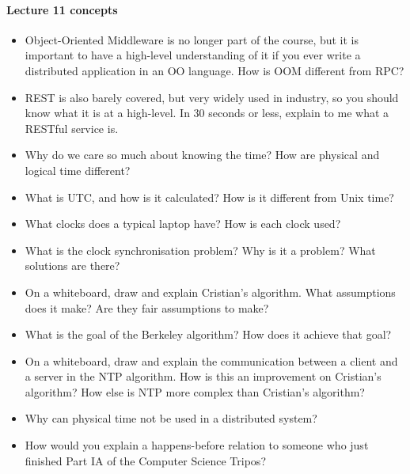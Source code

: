 \documentclass[12pt,a4paper,oneside,openright]{report}
\newcommand{\question}[2]{\paragraph{#1} #2}
\begin{document}
\question{Lecture 11 concepts}{
  \begin{itemize}
  \item Object-Oriented Middleware is no longer part of the course,
    but it is important to have a high-level understanding of it if
    you ever write a distributed application in an OO language. How is
    OOM different from RPC?
  \item REST is also barely covered, but very widely used in industry,
    so you should know what it is at a high-level. In 30 seconds or
    less, explain to me what a RESTful service is.
  \item Why do we care so much about knowing the time? How are
    physical and logical time different?
  \item What is UTC, and how is it calculated? How is it different
    from Unix time?
  \item What clocks does a typical laptop have? How is each clock
    used?
  \item What is the clock synchronisation problem? Why is it a
    problem? What solutions are there?
  \item On a whiteboard, draw and explain Cristian's algorithm. What
    assumptions does it make? Are they fair assumptions to make?
  \item What is the goal of the Berkeley algorithm? How does it
    achieve that goal?
  \item On a whiteboard, draw and explain the communication between a
    client and a server in the NTP algorithm. How is this an
    improvement on Cristian's algorithm? How else is NTP more complex
    than Cristian's algorithm?
  \item Why can physical time not be used in a distributed system?
  \item How would you explain a happens-before relation to someone who
    just finished Part IA of the Computer Science Tripos?
  \end{itemize}
}
\end{document}
